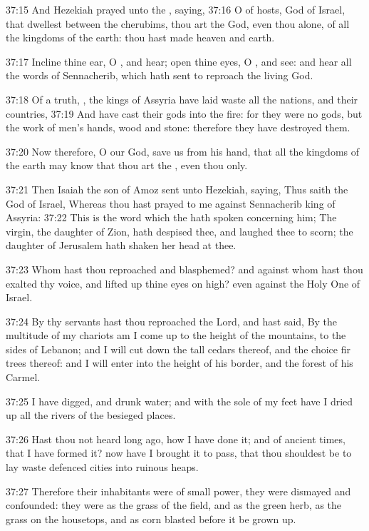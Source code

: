 37:15 And Hezekiah prayed unto the \LORD, saying, 37:16 O \LORD of
hosts, God of Israel, that dwellest between the cherubims, thou art
the God, even thou alone, of all the kingdoms of the earth: thou hast
made heaven and earth.

37:17 Incline thine ear, O \LORD, and hear; open thine eyes, O \LORD,
and see: and hear all the words of Sennacherib, which hath sent to
reproach the living God.

37:18 Of a truth, \LORD, the kings of Assyria have laid waste all the
nations, and their countries, 37:19 And have cast their gods into the
fire: for they were no gods, but the work of men's hands, wood and
stone: therefore they have destroyed them.

37:20 Now therefore, O \LORD our God, save us from his hand, that all
the kingdoms of the earth may know that thou art the \LORD, even thou
only.

37:21 Then Isaiah the son of Amoz sent unto Hezekiah, saying, Thus
saith the \LORD God of Israel, Whereas thou hast prayed to me against
Sennacherib king of Assyria: 37:22 This is the word which the \LORD
hath spoken concerning him; The virgin, the daughter of Zion, hath
despised thee, and laughed thee to scorn; the daughter of Jerusalem
hath shaken her head at thee.

37:23 Whom hast thou reproached and blasphemed? and against whom hast
thou exalted thy voice, and lifted up thine eyes on high? even against
the Holy One of Israel.

37:24 By thy servants hast thou reproached the Lord, and hast said, By
the multitude of my chariots am I come up to the height of the
mountains, to the sides of Lebanon; and I will cut down the tall
cedars thereof, and the choice fir trees thereof: and I will enter
into the height of his border, and the forest of his Carmel.

37:25 I have digged, and drunk water; and with the sole of my feet
have I dried up all the rivers of the besieged places.

37:26 Hast thou not heard long ago, how I have done it; and of ancient
times, that I have formed it? now have I brought it to pass, that thou
shouldest be to lay waste defenced cities into ruinous heaps.

37:27 Therefore their inhabitants were of small power, they were
dismayed and confounded: they were as the grass of the field, and as
the green herb, as the grass on the housetops, and as corn blasted
before it be grown up.

